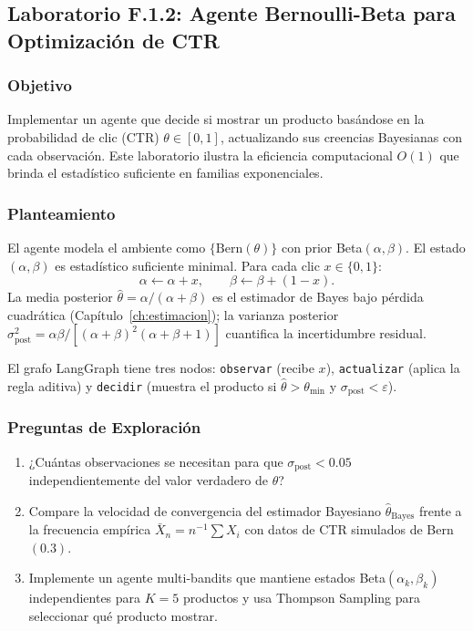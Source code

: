 \subsection*{Laboratorio F.1.2: Agente Bernoulli-Beta para Optimización de CTR}
\label{lab:F1.2}

\label{ex:ch1-bernoulli-beta}

\subsubsection*{Objetivo}

Implementar un agente que decide si mostrar un producto basándose en la
probabilidad de clic (CTR) $\theta \in [0,1]$, actualizando sus creencias
Bayesianas con cada observación. Este laboratorio ilustra la eficiencia
computacional $O(1)$ que brinda el estadístico suficiente en familias
exponenciales.

\subsubsection*{Planteamiento}

El agente modela el ambiente como $\{\text{Bern}(\theta)\}$ con prior
Beta$(\alpha,\beta)$. El estado $(\alpha,\beta)$ es estadístico suficiente
minimal. Para cada clic $x \in \{0,1\}$:
\[
    \alpha \leftarrow \alpha + x, \qquad \beta \leftarrow \beta + (1-x).
\]
La media posterior $\hat\theta = \alpha/(\alpha+\beta)$ es el estimador
de Bayes bajo pérdida cuadrática (Capítulo~\ref{ch:estimacion}); la varianza
posterior $\sigma^2_{\text{post}} = \alpha\beta/[(\alpha+\beta)^2(\alpha+\beta+1)]$
cuantifica la incertidumbre residual.

El grafo LangGraph tiene tres nodos: \texttt{observar} (recibe $x$),
\texttt{actualizar} (aplica la regla aditiva) y \texttt{decidir} (muestra
el producto si $\hat\theta > \theta_{\min}$ y $\sigma_{\text{post}} < \varepsilon$).

\subsubsection*{Preguntas de Exploración}

\begin{enumerate}
    \item ¿Cuántas observaciones se necesitan para que $\sigma_{\text{post}} < 0.05$
          independientemente del valor verdadero de $\theta$?
    \item Compare la velocidad de convergencia del estimador Bayesiano
          $\hat\theta_{\text{Bayes}}$ frente a la frecuencia empírica
          $\bar{X}_n = n^{-1}\sum X_i$ con datos de CTR simulados de Bern$(0.3)$.
    \item Implemente un agente multi-bandits que mantiene estados
          Beta$(\alpha_k,\beta_k)$ independientes para $K=5$ productos y
          usa Thompson Sampling para seleccionar qué producto mostrar.
\end{enumerate}

